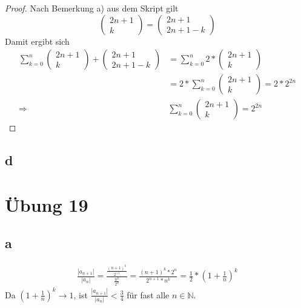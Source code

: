 \documentclass[a4paper,10pt]{article}
\begin{document}
\begin{proof}
 Nach Bemerkung a) aus dem Skript gilt
 \begin{equation}
  \begin{pmatrix}2n + 1\\k\end{pmatrix} = \begin{pmatrix}2n + 1\\2n + 1 - k\end{pmatrix}
 \end{equation}
 Damit ergibt sich
 \begin{align}
  \sum_{k = 0}^{n} \begin{pmatrix}2n + 1\\k\end{pmatrix} + \begin{pmatrix}2n + 1\\2n + 1 - k\end{pmatrix} & = \sum_{k = 0}^{n} 2 * \begin{pmatrix}2n + 1\\k\end{pmatrix}\\
  & = 2 * \sum_{k = 0}^{n} \begin{pmatrix}2n + 1\\k\end{pmatrix} = 2 * 2^{2n}\\
  \Rightarrow & \sum_{k = 0}^{n} \begin{pmatrix}2n + 1\\k\end{pmatrix} = 2^{2n}
 \end{align}
\end{proof}

\subsection*{d}

\section*{Übung 19}

\subsection*{a}

\begin{align}
 \frac{|a_{n + 1}|}{|a_n|} = \frac{\frac{(n + 1)^k}{2^{ + 1}}}{\frac{n^k}{2^n}} = \frac{(n + 1)^k * 2^n}{2^{n + 1} * n^k} = \frac{1}{2} * (1 + \frac{1}{n})^k
\end{align}
Da $(1 + \frac{1}{n})^k \rightarrow 1$, ist $\frac{|a_{n + 1}|}{|a_n|} < \frac{3}{4}$ für fast alle $n \in \mathbb{N}$.
\end{document}
